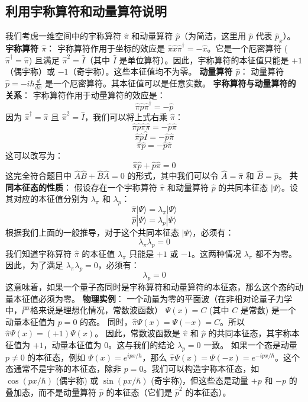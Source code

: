 \documentclass[12pt, a4paper]{article}
\begin{document}
\subsection{利用宇称算符和动量算符说明}
我们考虑一维空间中的宇称算符 \(\hat{\pi}\) 和动量算符 \(\hat{p}\)（为简洁，这里用 \(\hat{p}\) 代表 \(\hat{p}_x\)）。
\textbf{宇称算符 \(\hat{\pi}\)}：
宇称算符作用于坐标的效应是 \(\hat{\pi} \hat{x} \hat{\pi}^\dagger = -\hat{x}\)。它是一个厄密算符 (\(\hat{\pi}^\dagger = \hat{\pi}\)) 且满足 \(\hat{\pi}^2 = \hat{I}\)（其中 \(\hat{I}\) 是单位算符）。因此，宇称算符的本征值只能是 \(+1\)（偶宇称）或 \(-1\)（奇宇称）。这些本征值均不为零。
\textbf{动量算符 \(\hat{p}\)}：
动量算符 \(\hat{p} = -i\hbar \frac{d}{dx}\) 是一个厄密算符。其本征值可以是任意实数。
\textbf{宇称算符与动量算符的关系}：
宇称算符作用于动量算符的效应是：
\[ \hat{\pi} \hat{p} \hat{\pi}^\dagger = -\hat{p} \]
因为 \(\hat{\pi}^\dagger = \hat{\pi}\) 且 \(\hat{\pi}^2 = \hat{I}\)，我们可以将上式右乘 \(\hat{\pi}\)：
\[ \hat{\pi} \hat{p} \hat{\pi} \hat{\pi} = -\hat{p} \hat{\pi} \]
\[ \hat{\pi} \hat{p} \hat{I} = -\hat{p} \hat{\pi} \]
\[ \hat{\pi} \hat{p} = -\hat{p} \hat{\pi} \]
这可以改写为：
\[ \hat{\pi} \hat{p} + \hat{p} \hat{\pi} = 0 \]
这完全符合题目中 \(\hat{A}\hat{B} + \hat{B}\hat{A} = 0\) 的形式，其中我们可以令 \(\hat{A} = \hat{\pi}\) 和 \(\hat{B} = \hat{p}\)。
\textbf{共同本征态的性质}：
假设存在一个宇称算符 \(\hat{\pi}\) 和动量算符 \(\hat{p}\) 的共同本征态 \(|\Psi\rangle\)。设其对应的本征值分别为 \(\lambda_\pi\) 和 \(\lambda_p\)：
\[ \hat{\pi}|\Psi\rangle = \lambda_\pi |\Psi\rangle \]
\[ \hat{p}|\Psi\rangle = \lambda_p |\Psi\rangle \]
根据我们上面的一般推导，对于这个共同本征态 \(|\Psi\rangle\)，必须有：
\[ \lambda_\pi \lambda_p = 0 \]
我们知道宇称算符 \(\hat{\pi}\) 的本征值 \(\lambda_\pi\) 只能是 \(+1\) 或 \(-1\)。这两种情况 \(\lambda_\pi\) 都不为零。
因此，为了满足 \(\lambda_\pi \lambda_p = 0\)，必须有：
\[ \lambda_p = 0 \]
这意味着，如果一个量子态同时是宇称算符和动量算符的本征态，那么这个态的动量本征值必须为零。
\textbf{物理实例}：
一个动量为零的平面波（在非相对论量子力学中，严格来说是理想化情况，常数波函数） \(\Psi(x) = C\) (其中 \(C\) 是常数) 是一个动量本征值为 \(p=0\) 的态。
同时，\(\hat{\pi}\Psi(x) = \Psi(-x) = C\)。所以 \(\hat{\pi}\Psi(x) = (+1)\Psi(x)\)。
因此，常数波函数是 \(\hat{\pi}\) 和 \(\hat{p}\) 的共同本征态，其宇称本征值为 \(+1\)，动量本征值为 \(0\)。这与我们的结论 \(\lambda_p = 0\) 一致。
如果一个态是动量 \(p \neq 0\) 的本征态，例如 \(\Psi(x) = e^{ipx/\hbar}\)，那么 \(\hat{\pi}\Psi(x) = \Psi(-x) = e^{-ipx/\hbar}\)。这个态通常不是宇称的本征态，除非 \(p=0\)。我们可以构造宇称本征态，如 \(\cos(px/\hbar)\) (偶宇称) 或 \(\sin(px/\hbar)\) (奇宇称)，但这些态是动量 \(+p\) 和 \(-p\) 的叠加态，而不是动量算符 \(\hat{p}\) 的本征态（它们是 \(\hat{p}^2\) 的本征态）。
\end{document}
